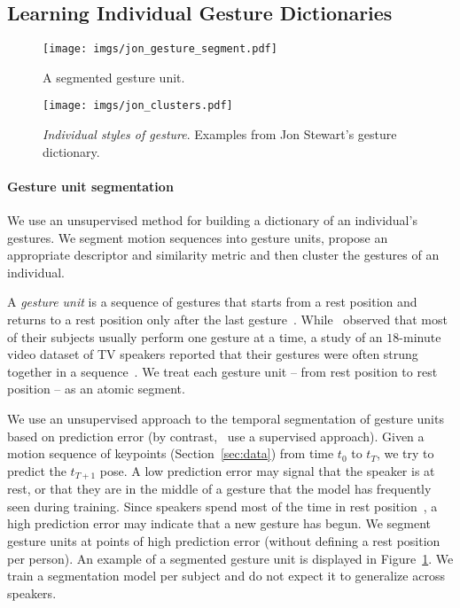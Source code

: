 \documentclass[10pt,twocolumn,letterpaper]{article}
\begin{document}
\subsection{Learning Individual Gesture Dictionaries}
\begin{figure}
  \centering \texttt{[image: imgs/jon\_gesture\_segment.pdf]}
  \caption{A segmented gesture unit.}
  \label{fig:example-gesture}
\end{figure}

\begin{figure}
\begin{center}
\texttt{[image: imgs/jon\_clusters.pdf]}\end{center}
  \caption{\emph{Individual styles of gesture}. Examples from Jon Stewart's gesture dictionary.}
\label{fig:space-of-gesures}
\end{figure}

\paragraph{Gesture unit segmentation}
We use an unsupervised method for building a dictionary of an individual's gestures. We segment motion sequences into gesture units, propose an appropriate descriptor and similarity metric and then cluster the gestures of an individual.

A \textit{gesture unit} is a sequence of gestures that starts from a rest position and returns to a rest position only after the last gesture~\cite{kendon_2004}. While~\cite{McNeill92} observed that most of their subjects usually perform one gesture at a time, a study of an $18$-minute video dataset of TV speakers reported that their gestures were often strung together in a sequence~\cite{Kipp-synthesis}. We treat each gesture unit -- from rest position to rest position -- as an atomic segment.

We use an unsupervised approach to the temporal segmentation of gesture units based on prediction error (by contrast,~\cite{SVN-segmentation} use a supervised approach). Given a motion sequence of keypoints (Section~\ref{sec:data}) from time $t_0$ to $t_T$, we try to predict the $t_{T+1}$ pose. A low prediction error may signal that the speaker is at rest, or that they are in the middle of a gesture that the model has frequently seen during training. Since speakers spend most of the time in rest position~\cite{kendon_2004}, a high prediction error may indicate that a new gesture has begun. We segment gesture units at points of high prediction error (without defining a rest position per person). An example of a segmented gesture unit is displayed in Figure~\ref{fig:example-gesture}.  We train a segmentation model per subject and do not expect it to generalize across speakers.
\end{document}

